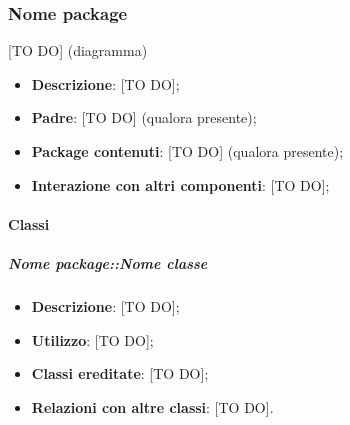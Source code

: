 	\subsubsection{Nome package} %
	\label{ssub:nome_del_package}
	[TO DO] (diagramma) \newline \newline

	\begin{itemize}
		\item \textbf{Descrizione}: [TO DO];
		\item \textbf{Padre}: [TO DO] (qualora presente);
		\item \textbf{Package contenuti}: [TO DO] (qualora presente);
		\item \textbf{Interazione con altri componenti}: [TO DO];
	\end{itemize}

		\paragraph{Classi} %
			\subparagraph{Nome package::Nome classe} %
			\label{subp:subparagraph_name}
				\begin{itemize}
					\item \textbf{Descrizione}: [TO DO];
					\item \textbf{Utilizzo}: [TO DO];
					\item \textbf{Classi ereditate}: [TO DO];
					\item \textbf{Relazioni con altre classi}: [TO DO].
				\end{itemize}




